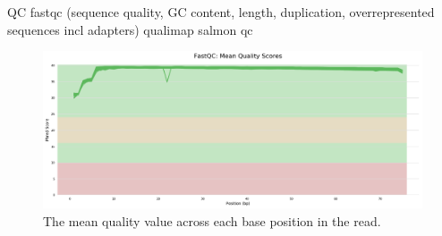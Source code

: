 
\begin{outline}
QC
\1 fastqc (sequence quality, GC content, length, duplication, overrepresented sequences incl adapters)
\1 qualimap
\1 salmon qc
\end{outline}

\begin{figure}
    \includegraphics[width=1.0\textwidth]{./mainmatter/figures/chapter_02/fastqc_Sequence Quality Histograms.png}
    \caption{The mean quality value across each base position in the read.}
    \label{fig:fastqc_sequenceQualityHistogram}
\end{figure}

